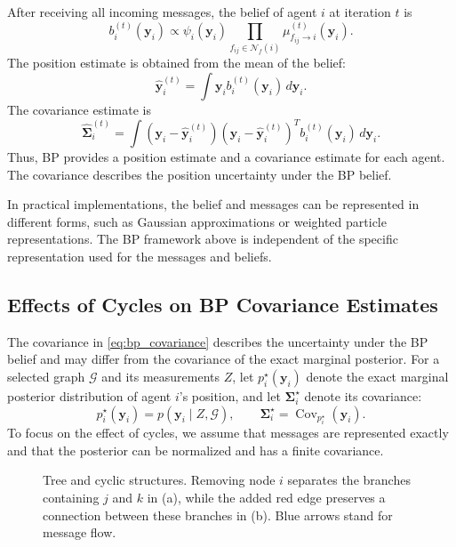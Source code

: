 After receiving all incoming messages, the belief of agent $i$ at iteration $t$ is
\begin{equation}
    b_i^{(t)}(\mathbf{y}_i)
    \propto
    \psi_i(\mathbf{y}_i)
    \prod_{f_{ij}\in\mathcal{N}_f(i)}
    \mu_{f_{ij}\rightarrow i}^{(t)}(\mathbf{y}_i).
    \label{eq:bp_belief}
\end{equation}
The position estimate is obtained from the mean of the belief:
\begin{equation}
    \hat{\mathbf{y}}_i^{(t)}
    =
    \int
    \mathbf{y}_i
    b_i^{(t)}(\mathbf{y}_i)
    \,d\mathbf{y}_i.
    \label{eq:bp_mean}
\end{equation}
The covariance estimate is
\begin{equation}
    \hat{\mathbf{\Sigma}}_i^{(t)}
    =
    \int
    \left(
    \mathbf{y}_i-\hat{\mathbf{y}}_i^{(t)}
    \right)
    \left(
    \mathbf{y}_i-\hat{\mathbf{y}}_i^{(t)}
    \right)^T
    b_i^{(t)}(\mathbf{y}_i)
    \,d\mathbf{y}_i.
    \label{eq:bp_covariance}
\end{equation}
Thus, BP provides a position estimate and a covariance estimate for each agent. The covariance describes the position uncertainty under the BP belief.

In practical implementations, the belief and messages can be represented in different forms, such as Gaussian approximations or weighted particle representations. The BP framework above is independent of the specific representation used for the messages and beliefs.

\subsection{Effects of Cycles on BP Covariance Estimates}
\label{sec:short_cycle_analysis}
The covariance in \eqref{eq:bp_covariance} describes the uncertainty under the BP belief and may differ from the covariance of the exact marginal posterior. For a selected graph $\mathcal{G}$ and its measurements $Z$, let $p_i^\star(\mathbf{y}_i)$ denote the exact marginal posterior distribution of agent $i$'s position, and let $\mathbf{\Sigma}_i^\star$ denote its covariance:
\[
    p_i^\star(\mathbf{y}_i)
    =p(\mathbf{y}_i\mid Z,\mathcal{G}),
    \qquad
    \mathbf{\Sigma}_i^\star
    =\operatorname{Cov}_{p_i^\star}(\mathbf{y}_i).
\]
To focus on the effect of cycles, we assume that messages are represented exactly and that the posterior can be normalized and has a finite covariance.

\begin{figure}[t]
    \centering
    \hfill
    \caption{Tree and cyclic structures. Removing node $i$ separates the branches containing $j$ and $k$ in (a), while the added red edge preserves a connection between these branches in (b). Blue arrows stand for message flow.}
    \label{fig:bp_tree_cycle}
\end{figure}

